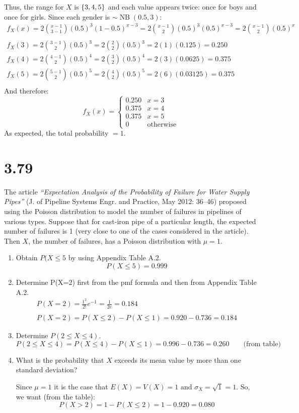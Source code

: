 \documentclass[letterpaper,12pt,fleqn]{article}
\DeclareMathOperator{\nb}{NB}
\renewcommand{\o}{\sigma}
\begin{document}
Thus, the range for \(X\) is \(\{3,4,5\}\) and each value appears twice: once for boys and once for girls.  Since each
gender is \(\sim\nb(0.5,3)\):
\begin{gather*}
  f_X(x)=2\binom{x-1}{3-1}(0.5)^3(1-0.5)^{x-3}=2\binom{x-1}{2}(0.5)^3(0.5)^{x-3}=2\binom{x-1}{2}(0.5)^x \\
  \\
  f_X(3)=2\binom{3-1}{2}(0.5)^3=2\binom{2}{2}(0.5)^3=2(1)(0.125)=0.250 \\
  f_X(4)=2\binom{4-1}{2}(0.5)^4=2\binom{3}{2}(0.5)^4=2(3)(0.0625)=0.375 \\
  f_X(5)=2\binom{5-1}{2}(0.5)^5=2\binom{4}{2}(0.5)^5=2(6)(0.03125)=0.375 \\
\end{gather*}
And therefore:
\[f_X(x)=\begin{cases}
0.250 & x=3 \\
0.375 & x=4 \\
0.375 & x=5 \\
0 & \text{otherwise}
\end{cases}\]
As expected, the total probability \(=1\).

\section*{3.79}

The article \emph{``Expectation Analysis of the Probability of Failure for Water Supply Pipes''} (J. of Pipeline Systems
Engr. and Practice, May 2012: 36--46) proposed using the Poisson distribution to model the number of failures in pipelines
of various types.  Suppose that for cast-iron pipe of a particular length, the expected number of failures is 1 (very close
to one of the cases considered in the article).  Then \(X\), the number of failures, has a Poisson distribution with
\(\mu=1\).

\begin{enumerate}[label={\alph*)}]
\item Obtain \(P(X\le5\) by using Appendix Table A.2.
  \[P(X\le5)=0.999\]
\item Determine P(X=2) first from the pmf formula and then from Appendix Table A.2.
  \begin{gather*}
    P(X=2)=\frac{1^2}{2!}e^{-1}=\frac{1}{2e}=0.184 \\
    \\
    P(X=2)=P(X\le2)-P(X\le1)=0.920-0.736=0.184
  \end{gather*}
\item Determine \(P(2\le X\le4)\).
  \[P(2\le X\le4)=P(X\le4)-P(X\le1)=0.996-0.736=0.260\qquad\text{(from table)}\]
\item What is the probability that \(X\) exceeds its mean value by more than one standard deviation?

  Since \(\mu=1\) it is the case that \(E(X)=V(X)=1\) and \(\o_X=\sqrt{1}=1\). So, we want (from the table):
  \[P(X>2)=1-P(X\le2)=1-0.920=0.080\]
\end{enumerate}
\end{document}
